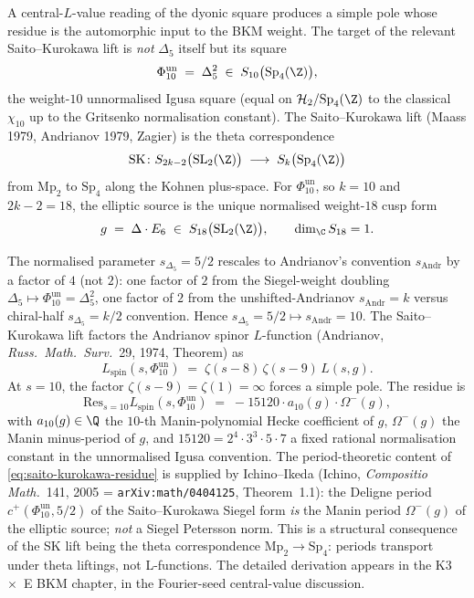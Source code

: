 A central-$L$-value reading of the dyonic square produces a simple pole whose residue is the automorphic input to the BKM weight. The target of the relevant Saito--Kurokawa lift is \emph{not} $\Delta_5$ itself but its square
\[
 \Phi_{10}^{\mathrm{un}} \;=\; \Delta_5^2 \;\in\; S_{10}\bigl(\mathrm{Sp}_4(\Z)\bigr),
\]
the weight-$10$ unnormalised Igusa square (equal on $\mathcal H_2 / \mathrm{Sp}_4(\Z)$ to the classical $\chi_{10}$ up to the Gritsenko normalisation constant). The Saito--Kurokawa lift (Maass 1979, Andrianov 1979, Zagier) is the theta correspondence
\[
 \mathrm{SK}\colon S_{2k - 2}\bigl(\mathrm{SL}_2(\Z)\bigr) \;\longrightarrow\; S_k\bigl(\mathrm{Sp}_4(\Z)\bigr)
\]
from $\mathrm{Mp}_2$ to $\mathrm{Sp}_4$ along the Kohnen plus-space. For $\Phi_{10}^{\mathrm{un}}$, so $k = 10$ and $2k - 2 = 18$, the elliptic source is the unique normalised weight-$18$ cusp form
\[
 g \;=\; \Delta \cdot E_6 \;\in\; S_{18}\bigl(\mathrm{SL}_2(\Z)\bigr), \qquad \dim_\C S_{18} = 1.
\]

The normalised parameter $s_{\Delta_5} = 5/2$ rescales to Andrianov's convention $s_{\mathrm{Andr}}$ by a factor of $4$ (not $2$): one factor of $2$ from the Siegel-weight doubling $\Delta_5 \mapsto \Phi_{10}^{\mathrm{un}} = \Delta_5^2$, one factor of $2$ from the unshifted-Andrianov $s_{\mathrm{Andr}} = k$ versus chiral-half \(s_{\Delta_5} = k/2\) convention. Hence $s_{\Delta_5} = 5/2 \mapsto s_{\mathrm{Andr}} = 10$. The Saito--Kurokawa lift factors the Andrianov spinor $L$-function (Andrianov, \emph{Russ.\ Math.\ Surv.}\ 29, 1974, Theorem) as
\[
 L_{\mathrm{spin}}(s, \Phi_{10}^{\mathrm{un}}) \;=\; \zeta(s - 8) \, \zeta(s - 9) \, L(s, g).
\]
At $s = 10$, the factor $\zeta(s - 9) = \zeta(1) = \infty$ forces a simple pole. The residue is
\begin{equation}
 \mathrm{Res}_{s = 10} L_{\mathrm{spin}}(s, \Phi_{10}^{\mathrm{un}}) \;=\; -15120 \cdot a_{10}(g) \cdot \Omega^-(g),
 \label{eq:saito-kurokawa-residue}
\end{equation}
with $a_{10}(g) \in \Q$ the $10$-th Manin-polynomial Hecke coefficient of $g$, $\Omega^-(g)$ the Manin minus-period of $g$, and $15120 = 2^4 \cdot 3^3 \cdot 5 \cdot 7$ a fixed rational normalisation constant in the unnormalised Igusa convention. The period-theoretic content of \eqref{eq:saito-kurokawa-residue} is supplied by Ichino--Ikeda (Ichino, \emph{Compositio Math.}\ 141, 2005 = \texttt{arXiv:math/0404125}, Theorem~1.1): the Deligne period $c^+(\Phi_{10}^{\mathrm{un}}, 5/2)$ of the Saito--Kurokawa Siegel form \emph{is} the Manin period $\Omega^-(g)$ of the elliptic source; \emph{not} a Siegel Petersson norm. This is a structural consequence of the SK lift being the theta correspondence $\mathrm{Mp}_2 \to \mathrm{Sp}_4$: periods transport under theta liftings, not L-functions. The detailed derivation appears in the K3~$\times$~E BKM chapter, in the Fourier-seed central-value discussion.

